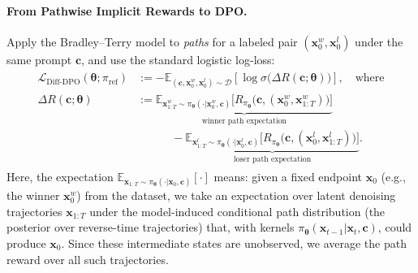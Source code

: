 \paragraph{From Pathwise Implicit Rewards to DPO.}
Apply the Bradley--Terry model to \emph{paths} for a labeled pair $(\mathbf x^w_0,\mathbf x^l_0)$ under the same prompt $\mathbf c$, and use the standard logistic log-loss:
\begin{align}\label{eq:diffusion-dpo}
\begin{aligned}
\mathcal L_{\mathrm{Diff\text{-}DPO}}(\bm\theta;\pi_{\mathrm{ref}})
&:=
- \mathbb E_{(\mathbf c,\mathbf x_0^w,\mathbf x_0^l)\sim\mathcal D}
 \left[\log \sigma \big(\Delta R(\mathbf c;\bm\theta)\big)\right], \quad \text{where}\\
\Delta R(\mathbf c;\bm\theta)
&:=
\underbrace{\mathbb E_{\mathbf x_{1:T}^w\sim \pi_{\bm\theta}(\cdot | \mathbf x_0^w,\mathbf c)}
 \Big[R_{\pi_{\bm\theta}} \big(\mathbf c,(\mathbf x_0^w,\mathbf x_{1:T}^w)\big)\Big]}_{\text{winner path expectation}}
\\ &\quad\quad\quad-
\underbrace{\mathbb E_{\mathbf x_{1:T}^l\sim \pi_{\bm\theta}(\cdot | \mathbf x_0^l,\mathbf c)}
 \Big[R_{\pi_{\bm\theta}} \big(\mathbf c,(\mathbf x_0^l,\mathbf x_{1:T}^l)\big)\Big]}_{\text{loser path expectation}}. 
\end{aligned}
\end{align}
Here, the expectation $\mathbb E_{\mathbf x_{1:T}\sim\pi_{\bm\theta}(\cdot|\mathbf x_0,\mathbf c)}[\cdot]$ means:
given a fixed endpoint $\mathbf x_0$ (e.g., the winner $\mathbf x_0^w$) from the dataset, we take an
expectation over latent denoising trajectories $\mathbf x_{1:T}$ under the model-induced conditional path
distribution (the posterior over reverse-time trajectories) that, with kernels
$\pi_{\bm\theta}(\mathbf x_{t-1}|\mathbf x_t,\mathbf c)$, could produce $\mathbf x_0$.
Since these intermediate states are unobserved, we average the path reward over all such trajectories.


